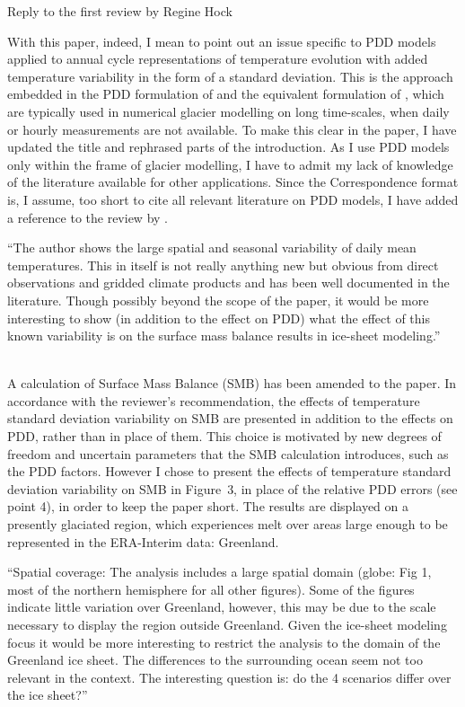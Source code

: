 \documentclass{letter}
\newcommand{\rev}[0]{\color{blue!50!black}\it}
\newcommand{\revpoint}[1]{{\rev\item``#1''}\\}
\begin{document}
\begin{letter}{Reply to the first review by Regine Hock}
\begin{enumerate}[resume]
    With this paper, indeed, I mean to point out an issue specific to PDD models applied to annual cycle representations of temperature evolution with added temperature variability in the form of a standard deviation. This is the approach embedded in the PDD formulation of \citet{calov-greve-2005} and the equivalent formulation of \citet{reeh-1991}, which are typically used in numerical glacier modelling on long time-scales, when daily or hourly measurements are not available. To make this clear in the paper, I have updated the title and rephrased parts of the introduction. As I use PDD models only within the frame of glacier modelling, I have to admit my lack of knowledge of the literature available for other applications. Since the Correspondence format is, I assume, too short to cite all relevant literature on PDD models, I have added a reference to the review by \citet{hock-2003}.

    \revpoint{The author shows the large spatial and seasonal variability of daily mean temperatures. This in itself is not really anything new but obvious from direct observations and gridded climate products and has been well documented in the literature. Though possibly beyond the scope of the paper, it would be more interesting to show (in addition to the effect on PDD) what the effect of this known variability is on the surface mass balance results in ice-sheet modeling.}

    A calculation of Surface Mass Balance (SMB) has been amended to the paper. In accordance with the reviewer's recommendation, the effects of temperature standard deviation variability on SMB are presented in addition to the effects on PDD, rather than in place of them. This choice is motivated by new degrees of freedom and uncertain parameters that the SMB calculation introduces, such as the PDD factors. However I chose to present the effects of temperature standard deviation variability on SMB in Figure~3, in place of the relative PDD errors (see point 4), in order to keep the paper short. The results are displayed on a presently glaciated region, which experiences melt over areas large enough to be represented in the ERA-Interim data: Greenland.

    \revpoint{Spatial coverage: The analysis includes a large spatial domain (globe: Fig 1, most of the northern hemisphere for all other figures). Some of the figures indicate little variation over Greenland, however, this may be due to the scale necessary to display the region outside Greenland. Given the ice-sheet modeling focus it would be more interesting to restrict the analysis to the domain of the Greenland ice sheet. The differences to the surrounding ocean seem not too relevant in the context. The interesting question is: do the 4 scenarios differ over the ice sheet?}


\end{enumerate}
\end{letter}
\end{document}
